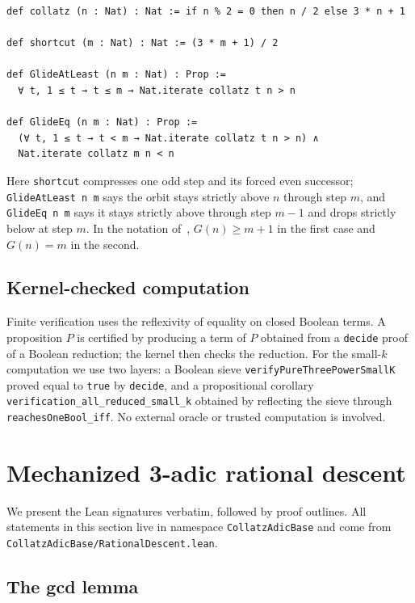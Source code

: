 \documentclass[11pt,a4paper]{article}
\begin{document}
\begin{lstlisting}
def collatz (n : Nat) : Nat := if n % 2 = 0 then n / 2 else 3 * n + 1

def shortcut (m : Nat) : Nat := (3 * m + 1) / 2

def GlideAtLeast (n m : Nat) : Prop :=
  ∀ t, 1 ≤ t → t ≤ m → Nat.iterate collatz t n > n

def GlideEq (n m : Nat) : Prop :=
  (∀ t, 1 ≤ t → t < m → Nat.iterate collatz t n > n) ∧
  Nat.iterate collatz m n < n
\end{lstlisting}

\noindent Here \texttt{shortcut} compresses one odd step and its forced even
successor; \texttt{GlideAtLeast n m} says the orbit stays strictly above $n$
through step $m$, and \texttt{GlideEq n m} says it stays strictly above through
step $m-1$ and drops strictly below at step $m$.  In the notation of~\cite{paper2},
$G(n)\ge m+1$ in the first case and $G(n)=m$ in the second.

\subsection{Kernel-checked computation}

Finite verification uses the reflexivity of equality on closed Boolean terms.
A proposition $P$ is certified by producing a term of $P$ obtained from a
\texttt{decide} proof of a Boolean reduction; the kernel then checks the
reduction.  For the small-$k$ computation we use two layers: a Boolean sieve
\texttt{verifyPureThreePowerSmallK} proved equal to \texttt{true} by
\texttt{decide}, and a propositional corollary
\texttt{verification\_all\_reduced\_small\_k} obtained by reflecting the sieve
through \texttt{reachesOneBool\_iff}.  No external oracle or trusted computation
is involved.

\section{Mechanized 3-adic rational descent}
\label{sec:descent}

We present the Lean signatures verbatim, followed by proof outlines.  All
statements in this section live in namespace \texttt{CollatzAdicBase} and come
from \texttt{CollatzAdicBase/RationalDescent.lean}.

\subsection{The gcd lemma}
\end{document}
